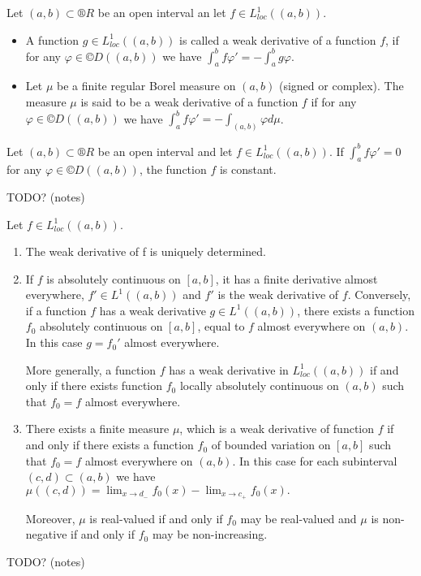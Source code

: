 \documentclass[12pt]{article}					%
\begin{document}
\begin{definice}
	Let $(a, b) \subset ®R$ be an open interval an let $f \in L^1_{loc}((a, b))$.
	\begin{itemize}
		\item A function $g \in L^1_{loc}((a, b))$ is called a weak derivative of a function $f$, if for any $φ \in ©D((a, b))$ we have $\int_a^b f φ' = -\int_a^b g φ$.
		\item Let $μ$ be a finite regular Borel measure on $(a, b)$ (signed or complex). The measure $μ$ is said to be a weak derivative of a function $f$ if for any $φ \in ©D((a, b))$ we have $\int_a^b f φ' = - \int_{(a, b)} φ dμ$.
	\end{itemize}
\end{definice}

\begin{tvrzeni}
	Let $(a, b) \subset ®R$ be an open interval and let $f \in L^1_{loc}((a, b))$. If $\int_a^b f φ' = 0$ for any $φ \in ©D((a, b))$, the function $f$ is constant.

	\begin{dukazin}
		TODO? (notes)
	\end{dukazin}
\end{tvrzeni}

\begin{veta}
	Let $f \in L^1_{loc}((a, b))$.

	\begin{enumerate}
		\item The weak derivative of f is uniquely determined.
		\item If $f$ is absolutely continuous on $[a, b]$, it has a finite derivative almost everywhere, $f' \in L^1((a, b))$ and $f'$ is the weak derivative of $f$. Conversely, if a function $f$ has a weak derivative $g \in L^1((a, b))$, there exists a function $f_0$ absolutely continuous on $[a, b]$, equal to $f$ almost everywhere on $(a, b)$. In this case $g = f_0'$ almost everywhere.

			More generally, a function $f$ has a weak derivative in $L^1_{loc}((a, b))$ if and only if there exists function $f_0$ locally absolutely continuous on $(a, b)$ such that $f_0 = f$ almost everywhere.
		\item There exists a finite measure $μ$, which is a weak derivative of function $f$ if and only if there exists a function $f_0$ of bounded variation on $[a, b]$ such that $f_0 = f$ almost everywhere on $(a, b)$. In this case for each subinterval $(c, d) \subset (a, b)$ we have $μ((c, d)) = \lim_{x \rightarrow d_-} f_0(x) - \lim_{x \rightarrow c_+} f_0(x).$

			Moreover, $μ$ is real-valued if and only if $f_0$ may be real-valued and $μ$ is non-negative if and only if $f_0$ may be non-increasing.
	\end{enumerate}

	\begin{dukazin}
		TODO? (notes)
	\end{dukazin}
\end{veta}
\end{document}

